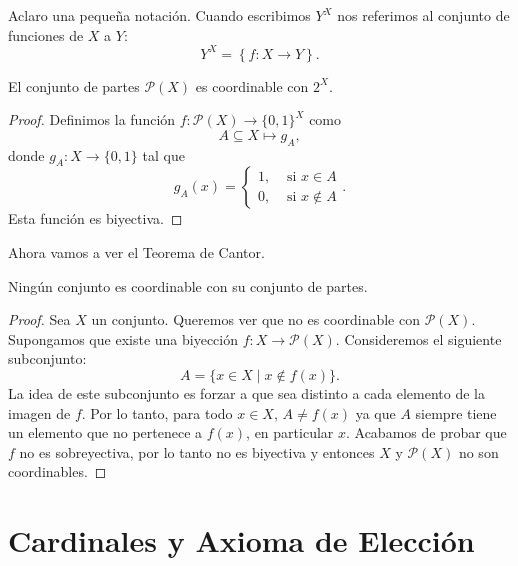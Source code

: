 Aclaro una pequeña notación. Cuando escribimos $Y^X$ nos referimos al conjunto de funciones de $X$ a $Y$:
\begin{equation*}
	Y^{X} = \left\{ f : X \to Y \right\}.
\end{equation*}

\begin{proposition}
	El conjunto de partes $\mathcal{P}(X)$ es coordinable con $2^X$.
\end{proposition}

\begin{proof}
	Definimos la función $f : \mathcal{P}(X) \to \{0, 1\}^X$ como
	\begin{equation*}
		A \subseteq X \mapsto g_A,
	\end{equation*}
	donde $g_A : X \to \{ 0, 1 \}$ tal que
	\begin{equation*}
		g_A(x) = \begin{cases}
			1, & \text{ si }x \in A      \\
			0, & \text{ si } x \not\in A
		\end{cases}.
	\end{equation*}
	Esta función es biyectiva.
\end{proof}

Ahora vamos a ver el Teorema de Cantor.

\begin{theorem}
	Ningún conjunto es coordinable con su conjunto de partes.
\end{theorem}

\begin{proof}
	Sea $X$ un conjunto. Queremos ver que no es coordinable con $\mathcal{P}(X)$. Supongamos que existe una biyección $f : X \to \mathcal{P}(X)$. Consideremos el siguiente subconjunto:
	\begin{equation*}
		A = \{ x \in X \mid x \not \in f(x) \}.
	\end{equation*}
	La idea de este subconjunto es forzar a que sea distinto a cada elemento de la imagen de $f$. Por lo tanto, para todo $x \in X$, $A \neq f(x)$ ya que $A$ siempre tiene un elemento que no pertenece a $f(x)$, en particular $x$. Acabamos de probar que $f$ no es sobreyectiva, por lo tanto no es biyectiva y entonces $X$ y $\mathcal{P}(X)$ no son coordinables.
\end{proof}

\section{Cardinales y Axioma de Elección}

